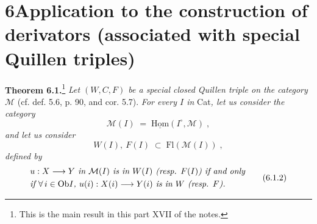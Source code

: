 \documentclass[11pt]{article}
\newcommand{\printedpage}[1]{\marginpar{\footnotesize p.~#1}}
\newcommand{\msp}[1]{\marginpar{\footnotesize [#1]}}
\newcommand{\Ob}{\mathrm{Ob}}
\newcommand{\Fl}{\mathrm{Fl}}
\begin{document}
\printedpage{49}

\msp{page 98}

\section*{6\quad Application to the construction of derivators (associated with special Quillen triples)}

\textbf{Theorem 6.1.}\footnote[29]{This is the main result in this part XVII of the notes.} \textit{Let $(W,C,F)$ be a special closed Quillen triple on the category $\mathcal{M}$} (cf. def. 5.6, p. 90, and cor. 5.7). \textit{For every $I$ in} Cat\textit{, let us consider the category}
\[
\mathcal{M}(I) \;=\; \underline{\mathrm{Hom}}(I^{\circ},\mathcal{M}) \;, \tag*{(6.1.1)}
\]
\textit{and let us consider}
\[
W(I),\ F(I) \;\subset\; \Fl(\mathcal{M}(I)) \;,
\]
\textit{defined by}
\[
\begin{aligned}
&\text{\textit{$u : X \longrightarrow Y$ in $\mathcal{M}(I)$ is in $W(I)$ (resp. $F(I)$) if and only}}\\
&\text{\textit{if $\forall\, i \in \Ob I$, $u(i) : X(i) \longrightarrow Y(i)$ is in $W$ (resp. $F$).}}
\end{aligned}
\tag*{(6.1.2)}
\]
\end{document}
